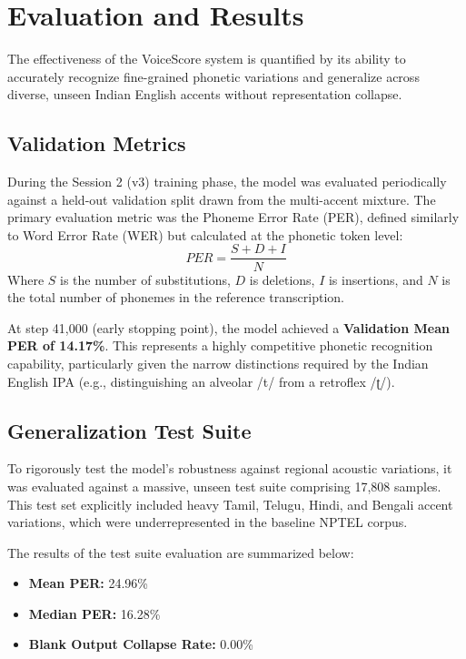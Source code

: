 \chapter{Evaluation and Results}

The effectiveness of the VoiceScore system is quantified by its ability to accurately recognize fine-grained phonetic variations and generalize across diverse, unseen Indian English accents without representation collapse.

\section{Validation Metrics}
During the Session 2 (v3) training phase, the model was evaluated periodically against a held-out validation split drawn from the multi-accent mixture. The primary evaluation metric was the Phoneme Error Rate (PER), defined similarly to Word Error Rate (WER) but calculated at the phonetic token level:
\begin{equation}
    PER = \frac{S + D + I}{N}
\end{equation}
Where $S$ is the number of substitutions, $D$ is deletions, $I$ is insertions, and $N$ is the total number of phonemes in the reference transcription.

At step 41,000 (early stopping point), the model achieved a \textbf{Validation Mean PER of 14.17\%}. This represents a highly competitive phonetic recognition capability, particularly given the narrow distinctions required by the Indian English IPA (e.g., distinguishing an alveolar /t/ from a retroflex /ʈ/).

\section{Generalization Test Suite}
To rigorously test the model's robustness against regional acoustic variations, it was evaluated against a massive, unseen test suite comprising 17,808 samples. This test set explicitly included heavy Tamil, Telugu, Hindi, and Bengali accent variations, which were underrepresented in the baseline NPTEL corpus.

The results of the test suite evaluation are summarized below:
\begin{itemize}
    \item \textbf{Mean PER:} 24.96\%
    \item \textbf{Median PER:} 16.28\%
    \item \textbf{Blank Output Collapse Rate:} 0.00\%
\end{itemize}

